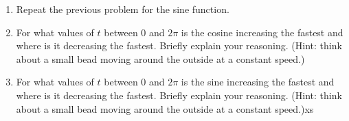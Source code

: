 \begin{enumerate}
\item Repeat the previous problem for the sine function.

\item For what values of $t$ between 0 and $2\pi$ is the cosine
  increasing the fastest and where is it decreasing the
  fastest. Briefly explain your reasoning. (Hint: think about a
  small bead moving around the outside at a constant speed.)

\item For what values of $t$ between 0 and $2\pi$ is the sine
  increasing the fastest and where is it decreasing the
  fastest. Briefly explain your reasoning. (Hint: think about a
  small bead moving around the outside at a constant speed.)xs

\end{enumerate}
